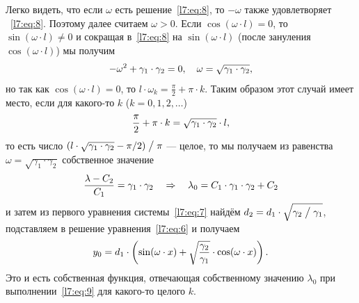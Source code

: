 Легко видеть, что если $\omega$ есть решение~\eqref{l7:eq:8}, то $-\omega$ также удовлетворяет ~\eqref{l7:eq:8}. Поэтому далее считаем $\omega>0$. Если $\cos(\omega\cdot l)=0$, то $\sin(\omega\cdot l)\neq0$ и сокращая в~\eqref{l7:eq:8} на $\sin(\omega\cdot l)$ (после зануления $\cos(\omega\cdot l)$) мы получим 
\begin{equation*}
	\hfill-\omega^2+\gamma_1\cdot\gamma_2=0,\quad\omega=\sqrt{\gamma_1\cdot\gamma_2},\hfill
\end{equation*}
но так как $\cos(\omega\cdot l)=0$, то $l\cdot\omega_k=\displaystyle\frac{\pi}{2}+\pi\cdot k$. Таким образом этот случай имеет место, если для какого-то $k$ ($k=0,1,2,\ldots$)
\begin{equation}
	\label{l7:eq:9}
	\hfill\frac{\pi}{2}+\pi\cdot k=\sqrt{\gamma_1\cdot\gamma_2}\cdot l,\hfill
\end{equation} 
то есть число $(l\cdot\sqrt{\gamma_1\cdot\gamma_2}-\pi/2)\bigm/\pi$ --- целое, то мы получаем из равенства $\omega=\sqrt{\gamma_1\cdot\gamma_2}$ собственное значение 
\begin{equation*}
	\hfill\frac{\lambda-C_2}{C_1}=\gamma_1\cdot\gamma_2\quad\Rightarrow\quad\lambda_0=C_1\cdot\gamma_1\cdot\gamma_2+C_2\hfill
\end{equation*}
и затем из первого уравнения системы~\eqref{l7:eq:7} найдём $d_2=d_1\cdot\sqrt{\gamma_2\bigm/\gamma_1}$, подставляем в решение уравнения~\eqref{l7:eq:6} и получаем 
\begin{equation*}
	\hfill y_0=d_1\cdot\left(\sin(\omega\cdot x)+\sqrt{\frac{\gamma_2}{\gamma_1}}\cdot\cos(\omega\cdot x)\right).\hfill
\end{equation*}
Это и есть собственная функция, отвечающая собственному значению $\lambda_0$ при выполнении~\eqref{l7:eq:9} для какого-то целого $k$. 

